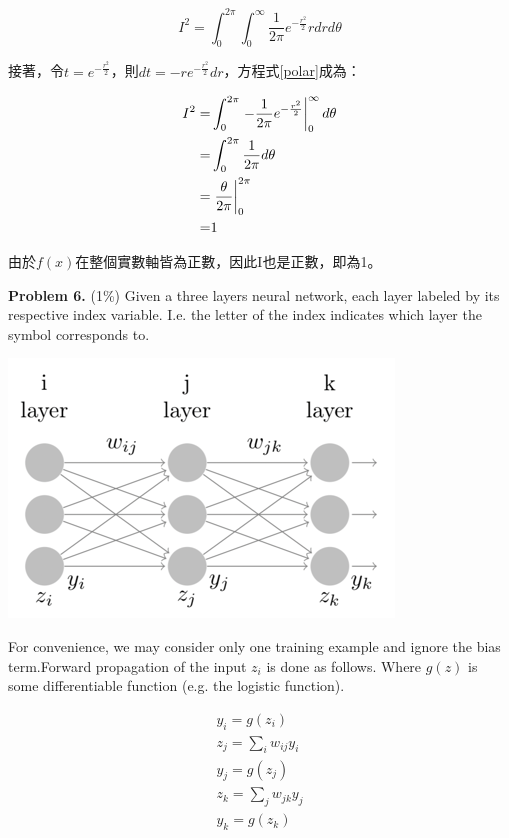 \documentclass{article}
\newcommand\rsx[1]{\left.{#1}\vphantom{\big|}\right|}
\begin{document}
\begin{equation}\label{polar}
I^2=\int_{0}^{2\pi}\int_{0}^{\infty}\frac{1}{2\pi}e^{-\frac{r^2}{2}}rdrd\theta
\end{equation}

接著，令$t=e^{-\frac{r^2}{2}}$，則$dt=-re^{-\frac{r^2}{2}}dr$，方程式\ref{polar}成為：

\begin{equation}
\begin{aligned}
I^2
=&\int_{0}^{2\pi}\rsx{-\frac{1}{2\pi}e^{-\frac{r^2}{2}}}_{0}^{\infty}d\theta\\
=&\int_{0}^{2\pi}\frac{1}{2\pi}d\theta\\
=&\rsx{\frac{\theta}{2\pi}}_{0}^{2\pi}\\
=&1
\end{aligned}
\end{equation}

由於$f(x)$在整個實數軸皆為正數，因此I也是正數，即為1。

\textbf{Problem 6.} (1\%) Given a three layers neural network, each layer labeled by its respective index variable. I.e. the letter of the index indicates which layer the symbol corresponds to.

\begin{center}
\includegraphics{network}
\end{center}

For convenience, we may consider only one training example and ignore the bias term.Forward propagation of the input $z_i$ is done as follows. Where $g(z)$ is some differentiable function (e.g. the logistic function).

\begin{equation*}
\begin{aligned}
y_i = g(z_i)\\
z_j = \sum_{i}^{}w_{ij}y_i\\
y_j = g(z_j)\\
z_k = \sum_{j}^{}w_{jk}y_j\\
y_k = g(z_k)
\end{aligned}
\end{equation*}
\end{document}
